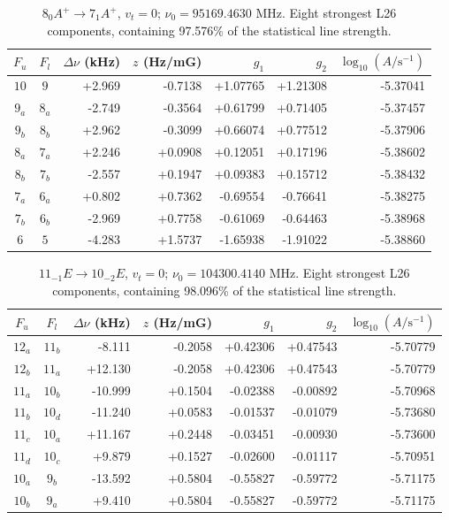 \begin{table}[!htbp]
\centering\small\renewcommand{\arraystretch}{1.1}\setlength{\tabcolsep}{5pt}
\caption{$8_{0} A^{+}\rightarrow 7_{1} A^{+}$, $v_t=0$; $\nu_0=95169.4630$ MHz. Eight strongest L26 components, containing 97.576\% of the statistical line strength.}
\label{tab:sm-zeeman-95}
\begin{tabular}{ccrrrrr}
\hline\hline
$F_u$ & $F_l$ & $\Delta\nu$ (kHz) & $z$ (Hz/mG) & $g_1$ & $g_2$ & $\log_{10}(A/\mathrm{s}^{-1})$ \\
\hline
$10$ & $9$ & +2.969 & -0.7138 & +1.07765 & +1.21308 & -5.37041\\
$9_{a}$ & $8_{a}$ & -2.749 & -0.3564 & +0.61799 & +0.71405 & -5.37457\\
$9_{b}$ & $8_{b}$ & +2.962 & -0.3099 & +0.66074 & +0.77512 & -5.37906\\
$8_{a}$ & $7_{a}$ & +2.246 & +0.0908 & +0.12051 & +0.17196 & -5.38602\\
$8_{b}$ & $7_{b}$ & -2.557 & +0.1947 & +0.09383 & +0.15712 & -5.38432\\
$7_{a}$ & $6_{a}$ & +0.802 & +0.7362 & -0.69554 & -0.76641 & -5.38275\\
$7_{b}$ & $6_{b}$ & -2.969 & +0.7758 & -0.61069 & -0.64463 & -5.38968\\
$6$ & $5$ & -4.283 & +1.5737 & -1.65938 & -1.91022 & -5.38860\\
\hline\end{tabular}
\end{table}

\begin{table}[!htbp]
\centering\small\renewcommand{\arraystretch}{1.1}\setlength{\tabcolsep}{5pt}
\caption{$11_{-1} E\rightarrow 10_{-2} E$, $v_t=0$; $\nu_0=104300.4140$ MHz. Eight strongest L26 components, containing 98.096\% of the statistical line strength.}
\label{tab:sm-zeeman-104}
\begin{tabular}{ccrrrrr}
\hline\hline
$F_u$ & $F_l$ & $\Delta\nu$ (kHz) & $z$ (Hz/mG) & $g_1$ & $g_2$ & $\log_{10}(A/\mathrm{s}^{-1})$ \\
\hline
$12_{a}$ & $11_{b}$ & -8.111 & -0.2058 & +0.42306 & +0.47543 & -5.70779\\
$12_{b}$ & $11_{a}$ & +12.130 & -0.2058 & +0.42306 & +0.47543 & -5.70779\\
$11_{a}$ & $10_{b}$ & -10.999 & +0.1504 & -0.02388 & -0.00892 & -5.70968\\
$11_{b}$ & $10_{d}$ & -11.240 & +0.0583 & -0.01537 & -0.01079 & -5.73680\\
$11_{c}$ & $10_{a}$ & +11.167 & +0.2448 & -0.03451 & -0.00930 & -5.73600\\
$11_{d}$ & $10_{c}$ & +9.879 & +0.1527 & -0.02600 & -0.01117 & -5.70951\\
$10_{a}$ & $9_{b}$ & -13.592 & +0.5804 & -0.55827 & -0.59772 & -5.71175\\
$10_{b}$ & $9_{a}$ & +9.410 & +0.5804 & -0.55827 & -0.59772 & -5.71175\\
\hline\end{tabular}
\end{table}

